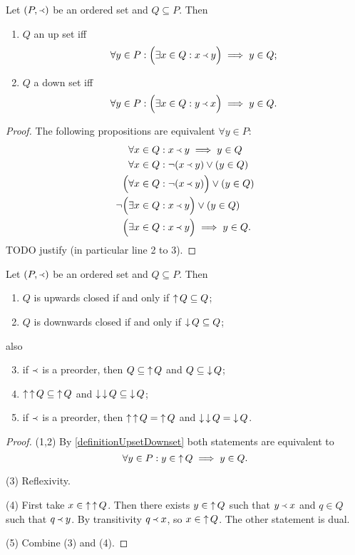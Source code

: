 \begin{lemma} \label{definitionUpsetDownset}
Let $\left( P, \Yleft \right)$ be an ordered set and $Q\subseteq P$. Then
\begin{enumerate}
\item $Q$ an up set iff 
\[ \forall y\in P: \Big(\exists x\in Q:  x\Yleft y\Big) \implies y\in Q; \]
\item $Q$ a down set iff 
\[ \forall y\in P: \Big(\exists x\in Q:  y\Yleft x\Big) \implies y\in Q. \]
\end{enumerate}
\end{lemma}
\begin{proof}
The following propositions are equivalent $\forall y\in P$:
\begin{align*}
&\forall x\in Q: x\Yleft y \implies y\in Q \\
&\forall x\in Q: \neg(x\Yleft y) \lor (y\in Q) \\
\Big(&\forall x\in Q: \neg(x\Yleft y)\Big) \lor (y\in Q) \\
\neg \Big(&\exists x\in Q: x\Yleft y \Big) \lor (y\in Q) \\
\Big(&\exists x\in Q:  x\Yleft y\Big) \implies y\in Q.
\end{align*}
TODO justify (in particular line 2 to 3).
\end{proof}

\begin{lemma} \label{QsubseteqDownQ} \label{upwardDownwardClosure}
Let $\left( P, \Yleft \right)$ be an ordered set and $Q\subseteq P$. Then
\begin{enumerate}
\item $Q$ is upwards closed \textup{if and only if} $\mathop{\uparrow} Q \subseteq Q$;
\item $Q$ is downwards closed \textup{if and only if} $\mathop{\downarrow} Q \subseteq Q$;
\end{enumerate}
also
\begin{enumerate} \setcounter{enumi}{2}
\item if $\Yleft$ is a preorder, then $Q \subseteq \mathop{\uparrow} Q$ and $Q \subseteq \mathop{\downarrow} Q$;
\item $\mathop{\uparrow}\mathop{\uparrow} Q \subseteq \mathop{\uparrow} Q$ and $\mathop{\downarrow}\mathop{\downarrow} Q \subseteq \mathop{\downarrow} Q$;
\item if $\Yleft$ is a preorder, then $\mathop{\uparrow}\mathop{\uparrow} Q = \mathop{\uparrow} Q$ and $\mathop{\downarrow}\mathop{\downarrow} Q = \mathop{\downarrow} Q$.
\end{enumerate}
\end{lemma}
\begin{proof}
(1,2) By \ref{definitionUpsetDownset} both statements are equivalent to
\[ \forall y\in P: y\in \mathop{\uparrow} Q \implies y\in Q. \]

(3) Reflexivity.

(4) First take $x\in \mathop{\uparrow}\mathop{\uparrow} Q$. Then there exists $y\in \mathop{\uparrow} Q$ such that $y\Yleft x$ and $q\in Q$ such that $q\Yleft y$. By transitivity $q \Yleft x$, so $x\in \mathop{\uparrow} Q$. The other statement is dual.

(5) Combine (3) and (4).
\end{proof}

